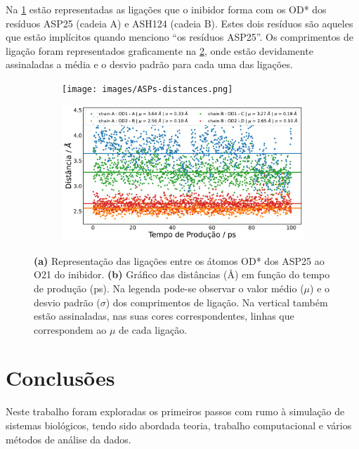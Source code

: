 \documentclass[12pt,a4paper]{article}
\begin{document}
	Na \cref{fig:an:dists-vmd} estão representadas as ligações que o inibidor forma com os OD* dos resíduos ASP25 (cadeia A)  e ASH124 (cadeia B). Estes dois resíduos são aqueles que estão implícitos quando menciono ``os resíduos ASP25''. Os comprimentos de ligação foram representados graficamente na \cref{fig:an:dists-plot}, onde estão devidamente assinaladas a média e o desvio padrão para cada uma das ligações.
	
	\begin{figure}[h]
		\begin{subfigure}[b]{0.34\textwidth}
			\centering
			\texttt{[image: images/ASPs-distances.png]}
			\caption{}
			\label{fig:an:dists-vmd}
		\end{subfigure}
		\begin{subfigure}[b]{0.64\textwidth}
			\centering
			\includegraphics[width=\textwidth]{images/plots-ASP-1UN.pdf}
			\caption{}
			\label{fig:an:dists-plot}
		\end{subfigure}
		\caption{\textbf{(a)} Representação das ligações entre os átomos OD* dos ASP25 ao O21 do inibidor. \textbf{(b)} Gráfico das distâncias (\AA) em função do tempo de produção (ps). Na legenda pode-se observar o valor médio ($\mu$) e o desvio padrão ($\sigma$) dos comprimentos de ligação. Na vertical também estão assinaladas, nas suas cores correspondentes, linhas que correspondem ao $\mu$ de cada ligação.}
		\label{fig:an:ASP-1UN}
	\end{figure}
\newpage
\section{Conclusões}
	Neste trabalho foram exploradas os primeiros passos com rumo à simulação de sistemas biológicos, tendo sido abordada teoria, trabalho computacional e vários métodos de análise da dados.
	
\end{document}
